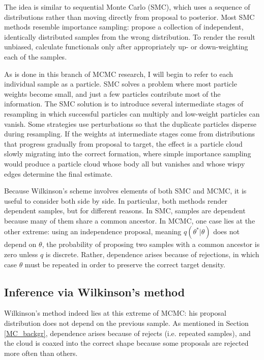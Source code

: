 \documentclass{article}
\begin{document}
The idea is similar to sequential Monte Carlo (SMC), which uses a sequence of distributions rather than moving directly from proposal to posterior. Most SMC methods resemble importance sampling: propose a collection of independent, identically distributed samples from the wrong distribution. To render the result unbiased, calculate functionals only after appropriately up- or down-weighting each of the samples. 

As is done in this branch of MCMC research, I will begin to refer to each individual sample as a particle. SMC solves a problem where most particle weights become small, and just a few particles contribute most of the information. The SMC solution is to introduce several intermediate stages of resampling in which successful particles can multiply and low-weight particles can vanish. Some strategies use perturbations so that the duplicate particles disperse during resampling. If the weights at intermediate stages come from distributions that progress gradually from proposal to target, the effect is a particle cloud slowly migrating into the correct formation, where simple importance sampling would produce a particle cloud whose body all but vanishes and whose wispy edges determine the final estimate. 

Because Wilkinson's scheme involves elements of both SMC and MCMC, it is useful to consider both side by side. In particular, both methods render dependent samples, but for different reasons. In SMC, samples are dependent because many of them share a common ancestor. In MCMC, one case lies at the other extreme: using an independence proposal, meaning $q(\theta^*|\theta)$ does not depend on $\theta$, the probability of proposing two samples with a common ancestor is zero unless $q$ is discrete. Rather, dependence arises because of rejections, in which case $\theta$ must be repeated in order to preserve the correct target density.

\subsection{Inference via Wilkinson's method}
Wilkinson's method indeed lies at this extreme of MCMC: his proposal distribution does not depend on the previous sample. As mentioned in Section \ref{MC_backgr}, dependence arises because of rejects (i.e. repeated samples), and the cloud is coaxed into the correct shape because some proposals are rejected more often than others. 
\end{document}
